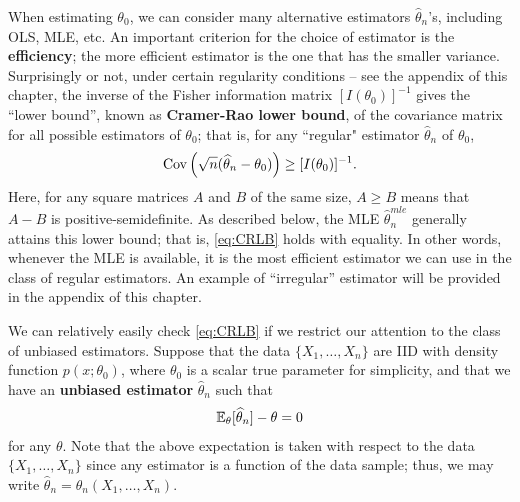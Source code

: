 \documentclass[11pt, A4paper, openany, uplatex]{book}
\begin{document}
When estimating $\theta_0$, we can consider many alternative estimators $\hat \theta_n$'s, including OLS, MLE, etc.
An important criterion for the choice of estimator is the \textbf{efficiency}; the more efficient estimator is the one that has the smaller variance.
Surprisingly or not, under certain regularity conditions --	see the appendix of this chapter, the inverse of the Fisher information matrix $[I(\theta_0)]^{-1}$ gives the ``lower bound'', known as \textbf{Cramer-Rao lower bound}, of the covariance matrix for all possible estimators of $\theta_0$; that is, for any ``regular" estimator $\hat \theta_n$ of $\theta_0$,
\begin{align}\label{eq:CRLB}
	\mathrm{Cov}\left(\sqrt{n}(\widehat \theta_n - \theta_0)\right) \ge [I(\theta_0)]^{-1}.
\end{align}
Here, for any square matrices $A$ and $B$ of the same size, $A \ge B$ means that $A - B$ is positive-semidefinite.
As described below, the MLE $\hat \theta_n^{mle}$ generally attains this lower bound; that is, \eqref{eq:CRLB} holds with equality.
In other words, whenever the MLE is available, it is the most efficient estimator we can use in the class of regular estimators.
An example of ``irregular'' estimator will be provided in the appendix of this chapter.
\bigskip

We can relatively easily check \eqref{eq:CRLB} if we restrict our attention to the class of unbiased estimators.
Suppose that the data $\{X_1, \ldots , X_n\}$ are IID with density function $p(x; \theta_0)$, where $\theta_0$ is a scalar true parameter for simplicity, and that we have an \textbf{unbiased estimator} $\hat \theta_n$ such that
\begin{align}\label{eq:unbiased}
	\mathbb{E}_\theta[\widehat \theta_n] - \theta = 0
\end{align}
for any $\theta$.
Note that the above expectation is taken with respect to the data $\{X_1, \ldots , X_n\}$ since any estimator is a function of the data sample; thus, we may write $\hat \theta_n = \theta_n(X_1, \ldots , X_n)$.
\bigskip
\end{document}
